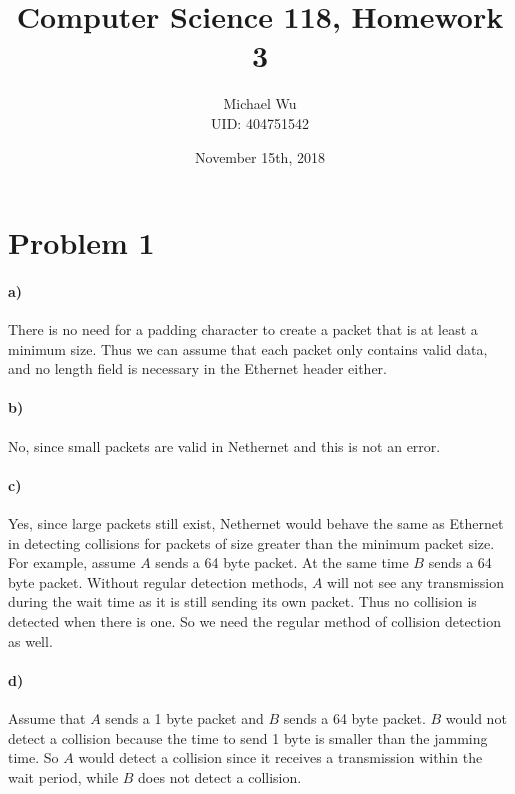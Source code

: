 \documentclass[12pt]{article}
\begin{document}
\title{Computer Science 118, Homework 3}
\date{November 15th, 2018}
\author{Michael Wu\\UID: 404751542}
\maketitle

\section*{Problem 1}

\paragraph{a)}

There is no need for a padding character to create a packet that is at least a minimum size. Thus we can assume that each packet only contains valid data,
and no length field is necessary in the Ethernet header either.

\paragraph{b)}

No, since small packets are valid in Nethernet and this is not an error.

\paragraph{c)}

Yes, since large packets still exist, Nethernet would behave the same as Ethernet in detecting collisions for packets of size greater than the minimum packet size.
For example, assume \(A\) sends a 64 byte packet. At the same time \(B\) sends a 64 byte packet. Without regular detection methods, \(A\) will not see any transmission
during the wait time as it is still sending its own packet. Thus no collision is detected when there is one. So we need the regular method of collision detection as well.

\paragraph{d)}

Assume that \(A\) sends a 1 byte packet and \(B\) sends a 64 byte packet. \(B\) would not detect a collision because the time to send 1 byte is smaller than the jamming time.
So \(A\) would detect a collision since it receives a transmission within the wait period, while \(B\) does not detect a collision.
\end{document}
